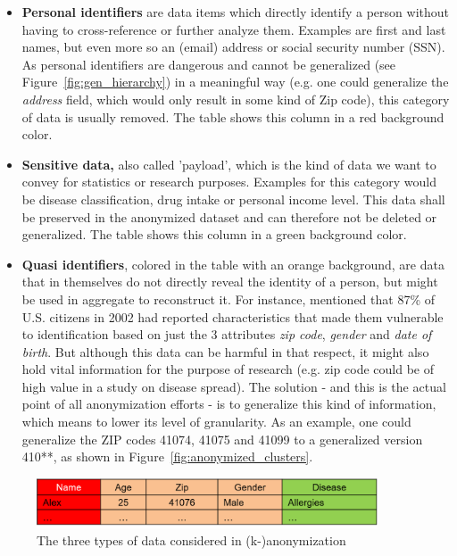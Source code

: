 \documentclass{llncs}
\begin{document}
\begin{itemize}
	\item \textbf{Personal identifiers} are data items which directly identify a person without having to cross-reference or further analyze them. Examples are first and last names, but even more so an (email) address or social security number (SSN). As personal identifiers are dangerous and cannot be generalized (see Figure~\ref{fig:gen_hierarchy}) in a meaningful way (e.g. one could generalize the \textit{address} field, which would only result in some kind of Zip code), this category of data is usually removed. The table shows this column in a red background color.
	\item \textbf{Sensitive data,} also called 'payload', which is the kind of data we want to convey for statistics or research purposes. Examples for this category would be disease classification, drug intake or personal income level. This data shall be preserved in the anonymized dataset and can therefore not be deleted or generalized. The table shows this column in a green background color.
	\item \textbf{Quasi identifiers}, colored in the table with an orange background, are data that in themselves do not directly reveal the identity of a person, but might be used in aggregate to reconstruct it. For instance, \cite{sweeney2002k} mentioned that 87\% of U.S. citizens in 2002 had reported characteristics that made them vulnerable to identification based on just the 3 attributes \textit{zip code}, \textit{gender} and \textit{date of birth}. But although this data can be harmful in that respect, it might also hold vital information for the purpose of research (e.g. zip code could be of high value in a study on disease spread). The solution - and this is the actual point of all anonymization efforts - is to generalize this kind of information, which means to lower its level of granularity. As an example, one could generalize the ZIP codes 41074, 41075 and 41099 to a generalized version 410**, as shown in Figure~\ref{fig:anonymized_clusters}.
\end{itemize}

\begin{figure}[!t]
	\begin{center}
		\includegraphics[width=0.9\textwidth]{figures/anonym/3typesofdata}
		\caption{The three types of data considered in (k-)anonymization}
		\label{fig:anon_categories}
	\end{center}
\end{figure}
\end{document}
